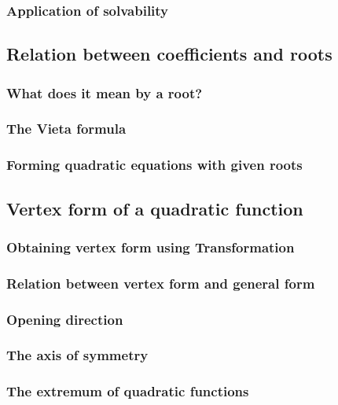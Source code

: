 \documentclass[12pt]{article}
\begin{document}
    \subsubsection*{Application of solvability}

    \subsection{Relation between coefficients and roots}

    \subsubsection*{What does it mean by a root?}

    \subsubsection*{The Vieta formula}

    \subsubsection*{Forming quadratic equations with given roots}

    \subsection{Vertex form of a quadratic function}

    \subsubsection*{Obtaining vertex form using Transformation}

    \subsubsection*{Relation between vertex form and general form}

    \subsubsection*{Opening direction}

    \subsubsection*{The axis of symmetry}

    \subsubsection*{The extremum of quadratic functions}
\end{document}
